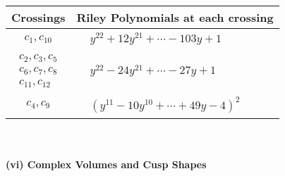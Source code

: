 \documentclass[1p]{elsarticle_modified}
\theoremstyle{definition}
\begin{document}
\begin{tabular}{m{50pt}|m{274pt}}
Crossings & \hspace{64pt}Riley Polynomials at each crossing \\
\hline $$\begin{aligned}c_{1},c_{10}\end{aligned}$$&$\begin{aligned}
&y^{22}+12 y^{21}+\cdots-103 y+1
\end{aligned}$\\
\hline $$\begin{aligned}c_{2},c_{3},c_{5}\\c_{6},c_{7},c_{8}\\c_{11},c_{12}\end{aligned}$$&$\begin{aligned}
&y^{22}-24 y^{21}+\cdots-27 y+1
\end{aligned}$\\
\hline $$\begin{aligned}c_{4},c_{9}\end{aligned}$$&$\begin{aligned}
&(y^{11}-10 y^{10}+\cdots+49 y-4)^{2}
\end{aligned}$\\
\hline
\end{tabular}\\~\\
\newpage\flushleft \textbf{(vi) Complex Volumes and Cusp Shapes}
\end{document}
